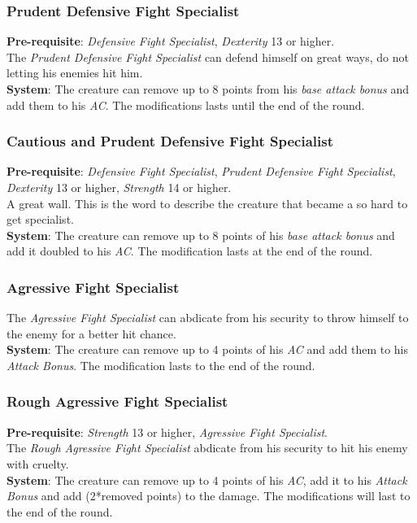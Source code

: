 \documentclass[ letterpaper,12pt]{article}
\begin{document}
\subsubsection{Prudent Defensive Fight Specialist}
{\bf Pre-requisite}: {\it Defensive Fight Specialist}, {\it Dexterity} 13 or higher.\\
The {\it Prudent Defensive Fight Specialist} can defend himself on great ways, do not letting his enemies hit him.\\
{\bf System}: The creature can remove up to 8 points from his{ \it base attack bonus} and add them to his {\it AC}. The modifications lasts until the end of the round.

\subsubsection{Cautious and Prudent Defensive Fight Specialist}
{\bf Pre-requisite}: {\it Defensive Fight Specialist}, {\it Prudent Defensive Fight Specialist}, {\it Dexterity} 13 or higher, {\it Strength} 14 or higher.\\
A great wall. This is the word to describe the creature that became a so hard to get specialist.\\
{\bf System}: The creature can remove up to 8 points of his {\it base attack bonus} and add it doubled to his {\it AC}. The modification lasts at the end of the round.

\subsubsection{Agressive Fight Specialist}
The {\it Agressive Fight Specialist} can abdicate from his security to throw himself to the enemy for a better hit chance.\\
{\bf System}: The creature can remove up to 4 points of his {\it AC} and add them to his {\it Attack Bonus}. The modification lasts to the end of the round.

\subsubsection{Rough Agressive Fight Specialist}
{\bf Pre-requisite}: {\it Strength} 13 or higher, {\it Agressive Fight Specialist}.\\
The {\it Rough Agressive Fight Specialist} abdicate from his security to hit his enemy with cruelty.\\
{\bf System}: The creature can remove up to 4 points of his {\it AC}, add it to his {\it Attack Bonus} and add (2*removed points) to the damage. The modifications will last to the end of the round.
\end{document}
